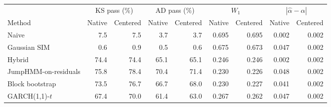 \begin{tabular}{lrrrrrrrr}
\toprule
 & \multicolumn{2}{c}{KS pass (\%)} & \multicolumn{2}{c}{AD pass (\%)} & \multicolumn{2}{c}{$W_1$} & \multicolumn{2}{c}{$|\hat\alpha-\alpha|$} \\
\cmidrule(lr){2-3}\cmidrule(lr){4-5}\cmidrule(lr){6-7}\cmidrule(lr){8-9}
Method & Native & Centered & Native & Centered & Native & Centered & Native & Centered \\
\midrule
Naive & 7.5 & 7.5 & 3.7 & 3.7 & 0.695 & 0.695 & 0.002 & 0.002 \\
Gaussian SIM & 0.6 & 0.9 & 0.5 & 0.6 & 0.675 & 0.673 & 0.047 & 0.002 \\
Hybrid & 74.4 & 74.4 & 65.1 & 65.1 & 0.246 & 0.246 & 0.002 & 0.002 \\
JumpHMM-on-residuals & 75.8 & 78.4 & 70.4 & 71.4 & 0.230 & 0.226 & 0.048 & 0.002 \\
Block bootstrap & 73.5 & 76.7 & 66.7 & 68.0 & 0.230 & 0.227 & 0.041 & 0.002 \\
GARCH(1,1)-$t$ & 67.4 & 70.0 & 61.4 & 63.0 & 0.267 & 0.262 & 0.047 & 0.002 \\
\bottomrule
\end{tabular}
